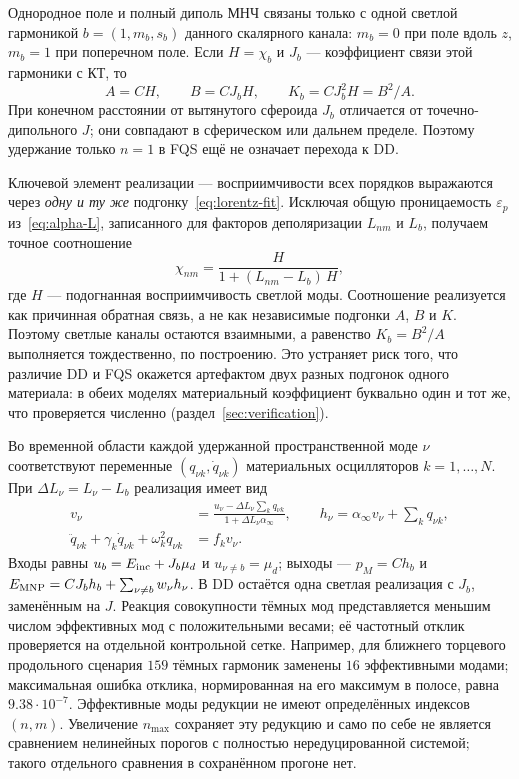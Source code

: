 Однородное поле и полный диполь МНЧ связаны только с одной светлой
гармоникой $b=(1,m_b,s_b)$ данного скалярного канала: $m_b=0$ при
поле вдоль $z$, $m_b=1$ при поперечном поле. Если $H=\chi_b$ и $J_b$
--- коэффициент связи этой гармоники с КТ, то
\begin{equation}
  A=CH,\qquad B=CJ_bH,\qquad K_b=CJ_b^2H=B^2/A.
  \label{eq:fqs-bright}
\end{equation}
При конечном расстоянии от вытянутого сфероида $J_b$ отличается от
точечно-дипольного $J$; они совпадают в сферическом или дальнем пределе.
Поэтому удержание только $n=1$ в FQS ещё не означает перехода к DD.

Ключевой элемент реализации — восприимчивости всех порядков выражаются через
\emph{одну и ту же} подгонку~\eqref{eq:lorentz-fit}. Исключая общую
проницаемость $\varepsilon_p$ из~\eqref{eq:alpha-L}, записанного для факторов
деполяризации $L_{nm}$ и $L_b$, получаем точное соотношение
\begin{equation}
  \chi_{nm} = \frac{H}{1 + (L_{nm} - L_b)\,H},
  \label{eq:modal-transform}
\end{equation}
где $H$ — подогнанная восприимчивость светлой моды. Соотношение реализуется как
причинная обратная связь, а не как независимые подгонки $A$, $B$ и $K$. Поэтому
светлые каналы остаются взаимными, а равенство $K_b = B^2/A$ выполняется
тождественно, по построению. Это устраняет риск того, что различие DD и FQS
окажется артефактом двух разных подгонок одного материала: в обеих моделях
материальный коэффициент буквально один и тот же, что проверяется численно
(раздел~\ref{sec:verification}).

Во временной области каждой удержанной пространственной моде $\nu$
соответствуют переменные $(q_{\nu k},\dot q_{\nu k})$ материальных
осцилляторов $k=1,\ldots,N$. При $\Delta L_\nu=L_\nu-L_b$ реализация имеет вид
\begin{align}
  v_\nu&=\frac{u_\nu-\Delta L_\nu\sum_kq_{\nu k}}
                   {1+\Delta L_\nu\alpha_\infty},\qquad
  h_\nu=\alpha_\infty v_\nu+\sum_kq_{\nu k},\label{eq:ade-feedback}\\
  \ddot q_{\nu k}+\gamma_k\dot q_{\nu k}+\omega_k^2q_{\nu k}
       &=f_kv_\nu.\label{eq:ade}
\end{align}
Входы равны $u_b=E_{\rm inc}+J_b\mu_d$ и $u_{\nu\ne b}=\mu_d$;
выходы --- $p_M=Ch_b$ и
$E_{\rm MNP}=CJ_bh_b+\sum_{\nu\ne b}w_\nu h_\nu$.
В DD остаётся одна светлая реализация с $J_b$, заменённым на $J$.
Реакция совокупности тёмных мод представляется меньшим числом эффективных
мод с положительными весами; её частотный отклик проверяется на отдельной
контрольной сетке. Например, для ближнего торцевого продольного сценария
$159$ тёмных гармоник заменены $16$ эффективными модами;
максимальная ошибка отклика, нормированная на его максимум в полосе,
равна $9.38\cdot10^{-7}$. Эффективные моды редукции не имеют определённых
индексов $(n,m)$. Увеличение $n_{\max}$ сохраняет эту редукцию и само по себе
не является сравнением нелинейных порогов с полностью нередуцированной
системой; такого отдельного сравнения в сохранённом прогоне нет.

